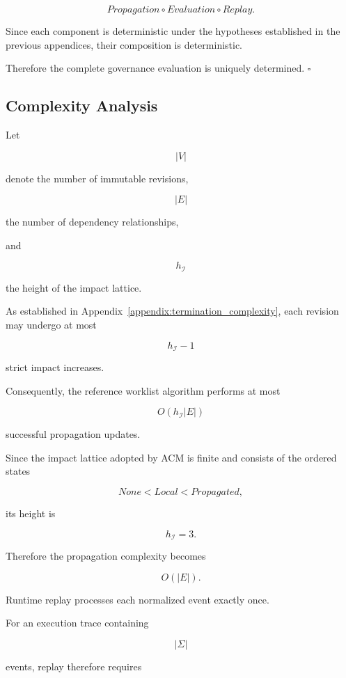 \documentclass[10pt]{article}
\begin{document}
	\[
	Propagation
	\circ
	Evaluation
	\circ
	Replay.
	\]
	
	Since each component is deterministic under the hypotheses established in the
	previous appendices, their composition is deterministic.
	
	Therefore the complete governance evaluation is uniquely determined.
	\hfill$\square$
	
	\subsection{Complexity Analysis}
	\label{appendix:complexity_analysis}
	
	Let
	
	\[
	|V|
	\]
	
	denote the number of immutable revisions,
	
	\[
	|E|
	\]
	
	the number of dependency relationships,
	
	and
	
	\[
	h_{\mathcal I}
	\]
	
	the height of the impact lattice.
	
	As established in Appendix~\ref{appendix:termination_complexity},
	each revision may undergo at most
	
	\[
	h_{\mathcal I}-1
	\]
	
	strict impact increases.
	
	Consequently, the reference worklist algorithm performs at most
	
	\[
	O(h_{\mathcal I}|E|)
	\]
	
	successful propagation updates.
	
	Since the impact lattice adopted by ACM is finite and consists of the ordered
	states
	
	\[
	None
	<
	Local
	<
	Propagated,
	\]
	
	its height is
	
	\[
	h_{\mathcal I}=3.
	\]
	
	Therefore the propagation complexity becomes
	
	\[
	O(|E|).
	\]
	
	Runtime replay processes each normalized event exactly once.
	
	For an execution trace containing
	
	\[
	|\Sigma|
	\]
	
	events, replay therefore requires
	
\end{document}
